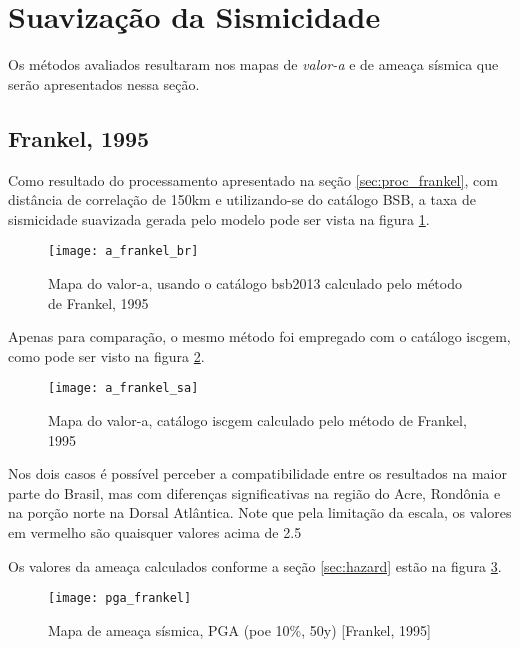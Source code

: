 \section{Suavização da Sismicidade}
\label{sec:suavizacao_resultados}

Os métodos avaliados resultaram nos mapas de \emph{valor-a} e de ameaça sísmica
que serão apresentados nessa seção.

\subsection{Frankel, 1995}
\label{sec:frankel_resultados}

Como resultado do processamento apresentado na seção \ref{sec:proc_frankel},
com distância de correlação de 150km e utilizando-se do catálogo BSB,
a taxa de sismicidade suavizada gerada pelo modelo pode ser vista na figura \ref{fig:a_fran_br}.
\begin{figure}[H]
  \centering
  \texttt{[image: a\_frankel\_br]} 
  \caption{Mapa do valor-a, usando o catálogo \gls{bsb2013} calculado pelo método de Frankel, 1995 }
  \label{fig:a_fran_br} 
\end{figure}

Apenas para comparação, o mesmo método foi empregado com o catálogo \gls{iscgem}, como pode ser visto na figura 
\ref{fig:a_fran_sa}.

\begin{figure}[H]
  \centering
  \texttt{[image: a\_frankel\_sa]} 
  \caption{Mapa do valor-a, catálogo \gls{iscgem} calculado pelo método de Frankel, 1995}
  \label{fig:a_fran_sa} 
\end{figure}

Nos dois casos é possível perceber a compatibilidade entre os resultados na maior parte do Brasil, mas com
diferenças significativas na região do Acre, Rondônia e na porção norte na Dorsal Atlântica. 
Note que pela limitação da escala, os valores em vermelho são quaisquer valores acima de 2.5

Os valores da ameaça calculados conforme a seção \ref{sec:hazard} estão na figura \ref{fig:pga_fran}.

\begin{figure}[H]
  \centering
  \texttt{[image: pga\_frankel]} 
  \caption{Mapa de ameaça sísmica, PGA (poe 10\%, 50y) [Frankel, 1995] }
  \label{fig:pga_fran} 
\end{figure}

